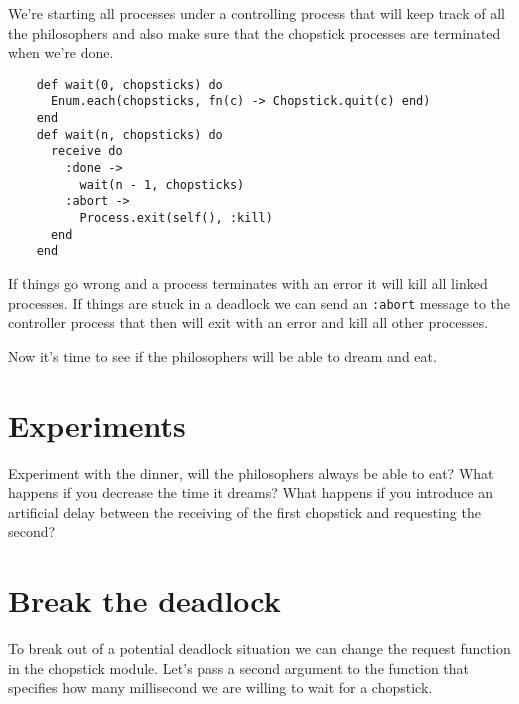 \documentclass[a4paper,11pt]{article}
\begin{document}
    We're starting all processes under a controlling process that will keep
    track of all the philosophers and also make sure that the chopstick
    processes are terminated when we're done.
    
    \begin{verbatim}
    def wait(0, chopsticks) do
      Enum.each(chopsticks, fn(c) -> Chopstick.quit(c) end)
    end
    def wait(n, chopsticks) do
      receive do
        :done ->
          wait(n - 1, chopsticks)
        :abort ->
          Process.exit(self(), :kill)
      end
    end
    \end{verbatim}
    
    If things go wrong and a process terminates with an error it will kill
    all linked processes. If things are stuck in a deadlock we can send
    an {\tt :abort} message to the controller process that then will exit
    with an error and kill all other processes.
    
    Now it's time to see if the philosophers will be able to dream and eat. 
    
    
    
    \section{Experiments}
    
    Experiment with the dinner, will the philosophers always be able to
    eat? What happens if you decrease the time it dreams? What happens if
    you introduce an artificial delay between the receiving of the first
    chopstick and requesting the second?
    
    
    
    \section{Break the deadlock}
    
    To break out of a potential deadlock situation we can change the
    request function in the chopstick module. Let's pass a second argument
    to the function that specifies how many millisecond we are willing to
    wait for a chopstick.
    
    \pagebreak
    
\end{document}
